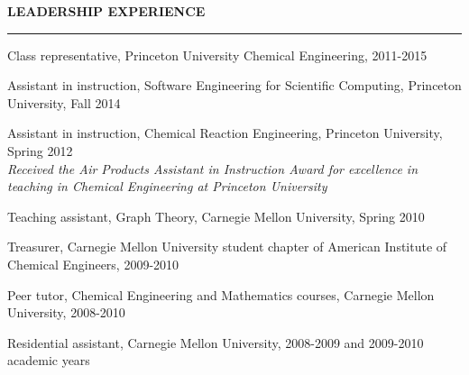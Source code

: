 \documentclass[letterpaper,10pt]{article}
\newenvironment{itemize*}
  {\begin{itemize}
    \setlength{\parskip}{-2pt}}
  {\end{itemize}}
\newcommand{\cvheading}[1]{
\vspace{0.11in}
\noindent
\MakeUppercase{\bf #1}
\vspace{0.06in}
{\hrule height 0.3mm}
\vspace{0.06in}}
\begin{document}
\cvheading{Leadership Experience}
\begin{itemize*}
\item Class representative, Princeton University Chemical Engineering, 2011-2015
\item Assistant in instruction, Software Engineering for Scientific Computing, Princeton University, Fall 2014
\item Assistant in instruction, Chemical Reaction Engineering, Princeton University, Spring 2012  \\
{\em \small Received the Air Products Assistant in Instruction Award for excellence in teaching in Chemical Engineering at Princeton University}
\item Teaching assistant, Graph Theory, Carnegie Mellon University, Spring 2010
\item Treasurer, Carnegie Mellon University student chapter of American Institute of Chemical Engineers, 2009-2010
\item Peer tutor, Chemical Engineering and Mathematics courses, Carnegie Mellon University, 2008-2010
\item Residential assistant, Carnegie Mellon University, 2008-2009 and 2009-2010 academic years
\end{itemize*}
\end{document}
